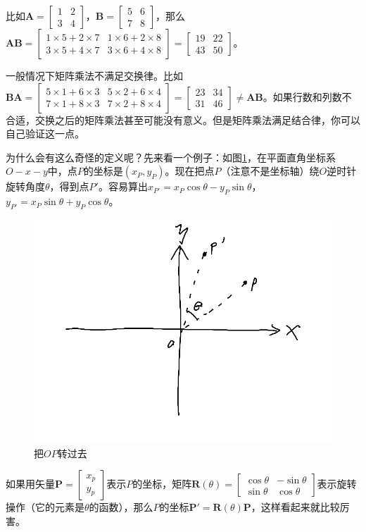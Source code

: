 比如$\mathbf{A}=\begin{bmatrix}
1 & 2 \\
3 & 4
\end{bmatrix}$，$\mathbf{B}=\begin{bmatrix}
5 & 6 \\
7 & 8
\end{bmatrix}$，那么$\mathbf{A} \mathbf{B}=\begin{bmatrix}
1 \times 5+2 \times 7 & 1 \times 6+2 \times 8 \\
3 \times 5+4 \times 7 & 3 \times 6+4 \times 8
\end{bmatrix}=\begin{bmatrix}
19 & 22 \\
43 & 50
\end{bmatrix}$。

一般情况下矩阵乘法不满足交换律。比如$\mathbf{B} \mathbf{A}=\begin{bmatrix}
5 \times 1+6 \times 3 & 5 \times 2+6 \times 4 \\
7 \times 1+8 \times 3 & 7 \times 2+8 \times 4
\end{bmatrix}=\begin{bmatrix}
23 & 34 \\
31 & 46
\end{bmatrix} \neq \mathbf{A} \mathbf{B}$。如果行数和列数不合适，交换之后的矩阵乘法甚至可能没有意义。但是矩阵乘法满足结合律，你可以自己验证这一点。

为什么会有这么奇怪的定义呢？先来看一个例子：如图\ref{fig-rotate}，在平面直角坐标系$O-x-y$中，点$P$的坐标是$(x_P, y_P)$。现在把点$P$（注意不是坐标轴）绕$O$逆时针旋转角度$\theta$，得到点$P'$。容易算出$x_{P'}=x_P \cos \theta-y_P \sin \theta$，$y_{P'}=x_P \sin \theta+y_P \cos \theta$。
\begin{figure}[htb]
\centering
\includegraphics[width=0.33\linewidth]{fig/rotate.png}
\caption{把$OP$转过去}
\label{fig-rotate}
\end{figure}

如果用矢量$\mathbf{P}=\begin{bmatrix} x_p \\ y_p \end{bmatrix}$表示$P$的坐标，矩阵$\mathbf{R}(\theta)=\begin{bmatrix}
\cos \theta & -\sin \theta \\
\sin \theta & \cos \theta
\end{bmatrix}$表示旋转操作（它的元素是$\theta$的函数），那么$P$的坐标$\mathbf{P'}=\mathbf{R}(\theta) \mathbf{P}$，这样看起来就比较厉害。

